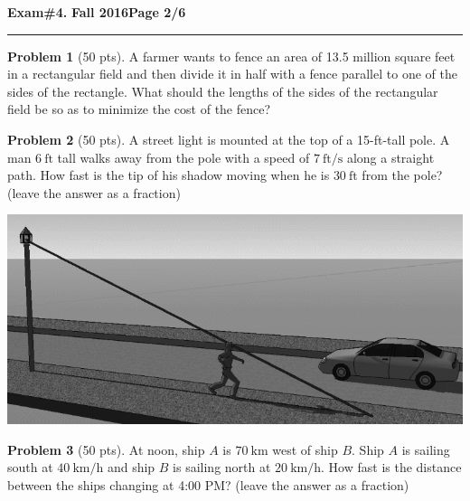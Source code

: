 \documentclass[12pt]{article}
\theoremstyle{definition}
\newtheorem{problem}{Problem}
\begin{document}
\hfill{\large\bf Exam\#4.}\hfill{\large\bf
  Fall 2016}\hfill{\large\bf Page 2/6}\hrule

\bigskip

\begin{problem}[50 pts] 
\large A farmer wants to fence an area of 13.5 million square feet in a rectangular field and then divide it in half with a fence parallel to one of the sides of the rectangle. What should the lengths of the sides of the rectangular field be so as to minimize the cost of the fence?
\end{problem}

\begin{problem}[50 pts] 
\large A street light is mounted at the top of a 15-ft-tall pole.  A man $6~\text{ft}$ tall walks away from the pole with a speed of $7~\text{ft}/\text{s}$ along a straight path.  How fast is the tip of his shadow moving when he is $30~\text{ft}$ from the pole? (leave the answer as a fraction)

\begin{center}
  \includegraphics[width=0.5\linewidth]{casey1.png}
\end{center}
\end{problem}

\begin{problem}[50 pts] 
\large At noon, ship $A$ is $70~\text{km}$ west of ship $B$.  Ship $A$ is sailing south at $40~\text{km}/\text{h}$ and ship $B$ is sailing north at $20~\text{km}/\text{h}$.  How fast is the distance between the ships changing at 4:00 PM? (leave the answer as a fraction)
\end{problem}
 
\end{document}
